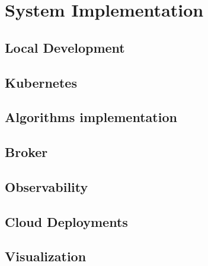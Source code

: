 \chapter{System Implementation}

\section{Local Development}


\section{Kubernetes}


\section{Algorithms implementation}


\section{Broker}


\section{Observability}


\section{Cloud Deployments}


\section{Visualization}

